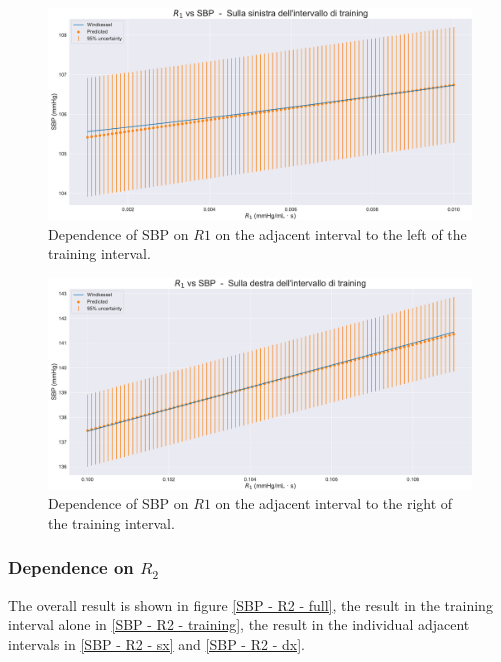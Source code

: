 \begin{figure}
    \centering
    \includegraphics[width=1\textwidth]{images/Training (risultati)/SBP/SBP - R1 - sx.pdf}
    \caption{Dependence of SBP on $R1$ on the adjacent interval to the left of the training interval.}
    \label{SBP - R1 - sx}
\end{figure}



\begin{figure}
    \centering
    \includegraphics[width=1\textwidth]{images/Training (risultati)/SBP/SBP - R1 - dx.pdf}
    \caption{Dependence of SBP on $R1$ on the adjacent interval to the right of the training interval.}
    \label{SBP - R1 - dx}
\end{figure}






\newpage
\subsubsection{Dependence on $R_2$}
The overall result is shown in figure \ref{SBP - R2 - full}, the result in the training interval alone in \ref{SBP - R2 - training}, the result in the individual adjacent intervals in \ref{SBP - R2 - sx} and \ref{SBP - R2 - dx}.

